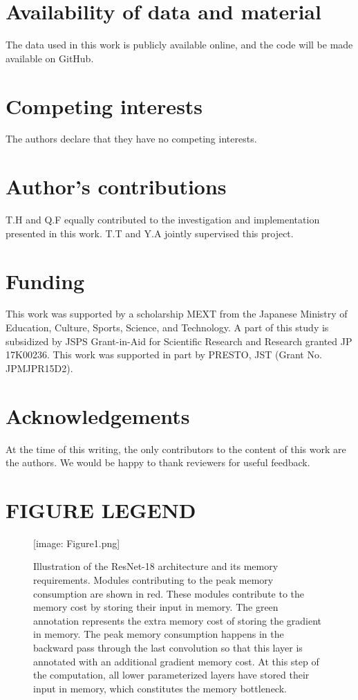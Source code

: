\documentclass[twocolumn]{bmcart}
\def\texttt{[image: ]}
\begin{document}
\begin{backmatter}
\section*{Availability of data and material}
The data used in this work is publicly available online, and the code will be made available on GitHub.

\section*{Competing interests}
The authors declare that they have no competing interests.

\section*{Author's contributions}
T.H and Q.F equally contributed to the investigation and implementation presented in this work. T.T and Y.A jointly supervised this project.

\section*{Funding}
This work was supported by a scholarship MEXT from the Japanese Ministry of Education, Culture, Sports, Science, and Technology.
A part of this study is subsidized by JSPS Grant-in-Aid for Scientific Research and Research granted JP 17K00236.
This work was supported in part by PRESTO, JST (Grant No. JPMJPR15D2).

\section*{Acknowledgements}
At the time of this writing, the only contributors to the content of this work are the authors.
We would be happy to thank reviewers for useful feedback.




\section*{FIGURE LEGEND}

\begin{figure}[t]
\texttt{[image: Figure1.png]}
\caption{
Illustration of the ResNet-18 architecture and its memory requirements.
Modules contributing to the peak memory consumption are shown in red.
These modules contribute to the memory cost by storing their input in memory.
The green annotation represents the extra memory cost of storing the gradient in memory.
The peak memory consumption happens in the backward pass through the last convolution so that this layer is annotated with an additional gradient memory cost.
At this step of the computation, all lower parameterized layers have stored their input in memory, which constitutes the memory bottleneck.
}
\end{figure}


\end{backmatter}
\end{document}
